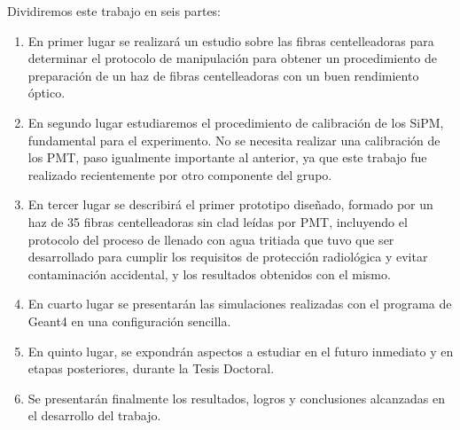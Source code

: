 Dividiremos este trabajo en seis partes:
\begin{enumerate}
\item{} En primer lugar se realizará un estudio sobre las fibras centelleadoras para  determinar  el protocolo de manipulación para obtener un  procedimiento de preparación de  un haz de fibras centelleadoras con un buen rendimiento óptico. 

\item{} En segundo lugar estudiaremos el procedimiento de calibración de los SiPM,  fundamental para el experimento.  No se necesita realizar una calibración de los PMT, paso igualmente importante al anterior, ya que este trabajo fue realizado recientemente por otro componente del grupo.

\item{} En tercer lugar se describirá  el primer prototipo diseñado, formado por un haz de 35 fibras centelleadoras sin clad leídas por PMT,  incluyendo el protocolo del proceso de llenado con agua tritiada que tuvo que ser desarrollado para cumplir los requisitos de protección radiológica y evitar contaminación accidental,  y los  resultados obtenidos con el mismo.

\item{} En cuarto lugar se presentarán las simulaciones realizadas con el programa de Geant4 en una configuración sencilla.

\item{} En quinto lugar, se expondrán aspectos a estudiar en el futuro inmediato y en etapas posteriores, durante la Tesis Doctoral. 


\item{} Se presentarán finalmente los resultados, logros y conclusiones alcanzadas en el desarrollo del  trabajo.

\end{enumerate}